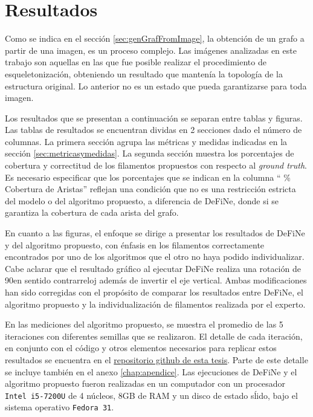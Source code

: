 \chapter{Resultados}
\label{chap:res}

Como se indica en el secci\'on \ref{sec:genGrafFromImage}, la obtenci\'on de un grafo a partir de una imagen, es un proceso complejo. Las im\'agenes analizadas en este trabajo son aquellas en las que fue posible realizar el procedimiento de esqueletonizaci\'on, obteniendo un resultado que manten\'ia la topolog\'ia de la estructura original. Lo anterior no es un estado que pueda garantizarse para toda imagen. 


Los resultados que se presentan a continuaci\'on se separan entre tablas y figuras. Las tablas de resultados se encuentran dividas en 2 secciones dado el n\'umero de columnas. La primera secci\'on agrupa las m\'etricas y medidas indicadas en la secci\'on \ref{sec:metricasymedidas}. La segunda secci\'on muestra los porcentajes de cobertura y correctitud de los filamentos propuestos con respecto al {\it ground truth}.
Es necesario especificar que los porcentajes que se indican en la columna `` \% Cobertura de Aristas'' reflejan una condici\'on que no es una restricci\'on estricta del modelo o del algoritmo propuesto, a diferencia de DeFiNe, donde si se garantiza la cobertura de cada arista del grafo.


En cuanto a las figuras, el enfoque se dirige a presentar los resultados de DeFiNe y del algoritmo propuesto, con \'enfasis en los filamentos correctamente encontrados por uno de los algoritmos que el otro no haya podido individualizar. Cabe aclarar que el resultado gr\'afico al ejecutar DeFiNe realiza una rotaci\'on de 90\textdegree en sentido contrarreloj adem\'as de invertir el eje vertical. Ambas modificaciones han sido corregidas con el prop\'osito de comparar los resultados entre DeFiNe, el algoritmo propuesto y la individualizaci\'on de filamentos realizada por el experto.


En las mediciones del algoritmo propuesto, se muestra el promedio de las 5 iteraciones con diferentes semillas que se realizaron. El detalle de cada iteraci\'on, en conjunto con el c\'odigo y otros elementos necesarios para replicar estos resultados se encuentra en el \href{https://gitlab.com/LeoXDXp/graph-crawler}{repositorio github de esta tesis}. Parte de este detalle se incluye tambi\'en en el anexo \ref{chap:apendice}.
Las ejecuciones de DeFiNe y el algoritmo propuesto fueron realizadas en un computador con un procesador {\tt Intel i5-7200U} de 4 n\'ucleos, 8GB de RAM y un disco de estado s\'lido, bajo el sistema operativo {\tt Fedora 31}.

